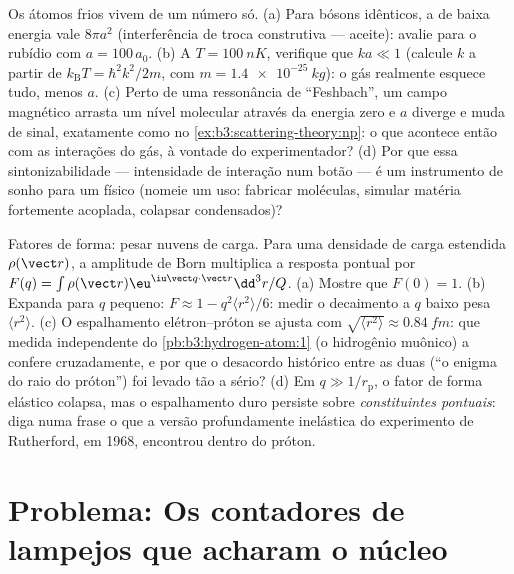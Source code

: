\begin{exercise}[$\star\star\star$]\label{exo:b3:scattering-theory:11}
Os átomos frios vivem de um número só. (a) Para bósons idênticos, a
 de baixa energia vale $8\pi a^2$ (interferência de troca
construtiva --- aceite): avalie para o rubídio com $a =
100\,a_0$. (b) A $T = \qty{100}{nK}$, verifique que $ka \ll 1$
(calcule $k$ a partir de $k_{\text{B}}T = \hbar^2k^2/2m$, com $m =
\qty{1.4e-25}{kg}$): o gás realmente esquece tudo, menos $a$.
(c) Perto de uma ressonância de ``Feshbach'', um campo magnético
arrasta um nível molecular através da energia zero e $a$ diverge e muda
de sinal, exatamente como no \cref{ex:b3:scattering-theory:np}: o que
acontece então com as interações do gás, à vontade do experimentador?
(d) Por que essa sintonizabilidade --- intensidade de interação num
botão --- é um instrumento de sonho para um físico (nomeie um uso:
fabricar moléculas, simular matéria fortemente acoplada, colapsar
condensados)?
\end{exercise}

\begin{exercise}[$\star\star\star$]\label{exo:b3:scattering-theory:12}
Fatores de forma: pesar nuvens de carga. Para uma densidade de carga
estendida $\rho(\vect r)$, a amplitude de Born multiplica a resposta
pontual por $F(q) = \int\rho(\vect r)\eu^{\iu\vect q\cdot\vect r}
\dd^3r/Q$. (a) Mostre que $F(0) = 1$. (b) Expanda para $q$ pequeno: $F
\approx 1 - q^2\langle r^2\rangle/6$: medir o decaimento a $q$ baixo
pesa $\langle r^2\rangle$. (c) O espalhamento elétron--próton se ajusta
com $\sqrt{\langle r^2\rangle} \approx \qty{0.84}{fm}$: que medida
independente do
\cref{pb:b3:hydrogen-atom:1} (o hidrogênio muônico) a confere
cruzadamente, e por que o desacordo histórico entre as duas (``o enigma
do raio do próton'') foi levado tão a sério? (d) Em $q \gg 1/r_{\text{p}}$,
o fator de forma elástico colapsa, mas o espalhamento duro persiste
sobre \emph{constituintes pontuais}: diga numa frase o que a versão
profundamente inelástica do experimento de Rutherford, em 1968,
encontrou dentro do próton.
\end{exercise}

\section{Problema: Os contadores de lampejos que acharam o núcleo}

